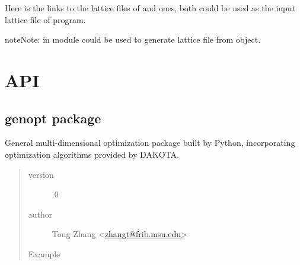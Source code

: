 \documentclass[letterpaper,10pt,english]{sphinxmanual}
\begin{document}
Here is the links to the lattice files of
 and
 ones, both could be
used as the input lattice file of  program.

\begin{sphinxadmonition}{note}{Note:}
{\hyperref[\detokenize{src/apidocs/dakutils:genopt.dakutils.generate_latfile}]{}}
in module 
could be used to generate lattice file from  object.
\end{sphinxadmonition}


\chapter{API}
\label{\detokenize{src/apidoc:api}}\label{\detokenize{src/apidoc::doc}}

\section{genopt package}
\label{\detokenize{src/apidocs/genopt:genopt-package}}\label{\detokenize{src/apidocs/genopt::doc}}\label{\detokenize{src/apidocs/genopt:module-genopt}}
General multi-dimensional optimization package built by Python,
incorporating optimization algorithms provided by DAKOTA.
\begin{quote}\begin{description}
\item[{version}] .0

\item[{author}] \leavevmode
Tong Zhang \textless{}\href{mailto:zhangt@frib.msu.edu}{zhangt@frib.msu.edu}\textgreater{}

\item[{Example}] \leavevmode
\end{description}\end{quote}
\end{document}
